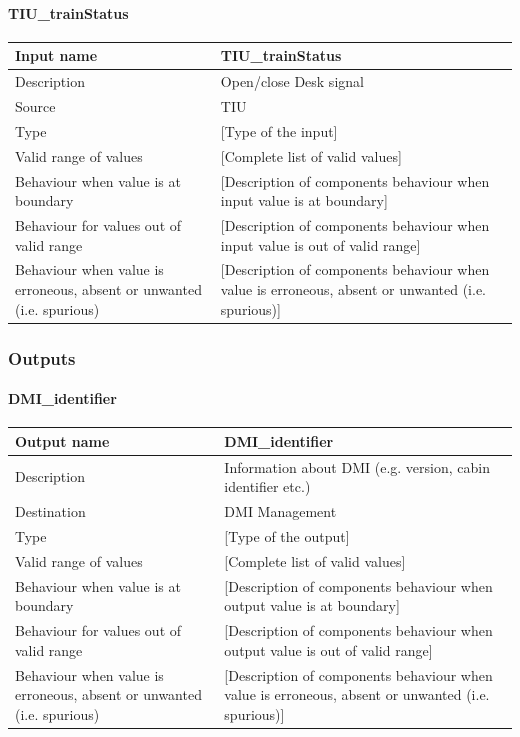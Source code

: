 \paragraph{TIU\_trainStatus}

\begin{longtable}{p{}p{}}
\toprule
Input name				& TIU\_trainStatus \\
\midrule
Description				& Open/close Desk signal \\
\midrule
Source					& TIU \\ 
\midrule
Type					& [Type of the input] \\
\midrule
Valid range of values	& [Complete list of valid values] \\
\midrule
Behaviour when value is at boundary	& [Description of components behaviour when input value is at boundary] \\
\midrule
Behaviour for values out of valid range	& [Description of components behaviour when input value is out of valid range] \\
\midrule
Behaviour when value is erroneous, absent or unwanted (i.e. spurious) & [Description of components behaviour when value is erroneous, absent or unwanted (i.e. spurious)] \\
\bottomrule
\end{longtable}



\subsubsection{Outputs}\label{s:DMI_outputs}

\paragraph{DMI\_identifier}

\begin{longtable}{p{}p{}}
\toprule
Output name				& DMI\_identifier \\
\midrule
Description				& Information about DMI (e.g. version, cabin identifier etc.) \\
\midrule
Destination				& DMI Management \\ 
\midrule
Type					& [Type of the output] \\
\midrule
Valid range of values	& [Complete list of valid values] \\
\midrule
Behaviour when value is at boundary	& [Description of components behaviour when output value is at boundary] \\
\midrule
Behaviour for values out of valid range	& [Description of components behaviour when output value is out of valid range] \\
\midrule
Behaviour when value is erroneous, absent or unwanted (i.e. spurious) & [Description of components behaviour when value is erroneous, absent or unwanted (i.e. spurious)] \\
\bottomrule
\end{longtable}

